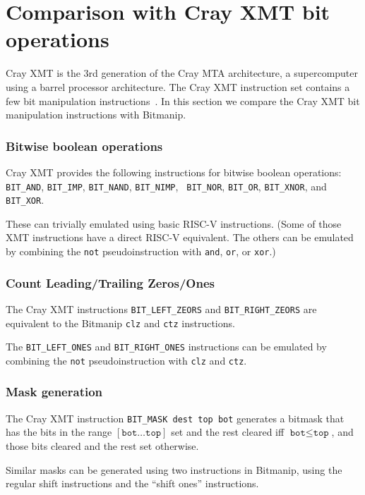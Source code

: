 \section{Comparison with Cray XMT bit operations}

Cray XMT is the 3rd generation of the Cray MTA architecture, a supercomputer
using a barrel processor architecture. The Cray XMT instruction set contains
a few bit manipulation instructions~\cite{CrayXMT}. In this section we compare
the Cray XMT bit manipulation instructions with Bitmanip.

\subsubsection{Bitwise boolean operations}

Cray XMT provides the following instructions for bitwise boolean operations:
{\tt BIT\_AND}, {\tt BIT\_IMP}, {\tt BIT\_NAND}, {\tt BIT\_NIMP}, {\tt
BIT\_NOR}, {\tt BIT\_OR}, {\tt BIT\_XNOR}, and {\tt BIT\_XOR}.

These can trivially emulated using basic RISC-V instructions. (Some of those
XMT instructions have a direct RISC-V equivalent. The others can be emulated
by combining the {\tt not} pseudoinstruction with {\tt and}, {\tt or}, or {\tt xor}.)

\subsubsection{Count Leading/Trailing Zeros/Ones}

The Cray XMT instructions {\tt BIT\_LEFT\_ZEORS} and {\tt BIT\_RIGHT\_ZEORS} are
equivalent to the Bitmanip {\tt clz} and {\tt ctz} instructions.

The {\tt BIT\_LEFT\_ONES} and {\tt BIT\_RIGHT\_ONES} instructions can be emulated
by combining the {\tt not} pseudoinstruction with {\tt clz} and {\tt ctz}.

\subsubsection{Mask generation}

The Cray XMT instruction {\tt BIT\_MASK dest top bot} generates a bitmask
that has the bits in the range $[\texttt{bot} \dots \texttt{top}]$ set
and the rest cleared iff $\texttt{bot} \le \texttt{top}$, and those
bits cleared and the rest set otherwise.

Similar masks can be generated using two instructions in Bitmanip,
using the regular shift instructions and the ``shift ones'' instructions.

